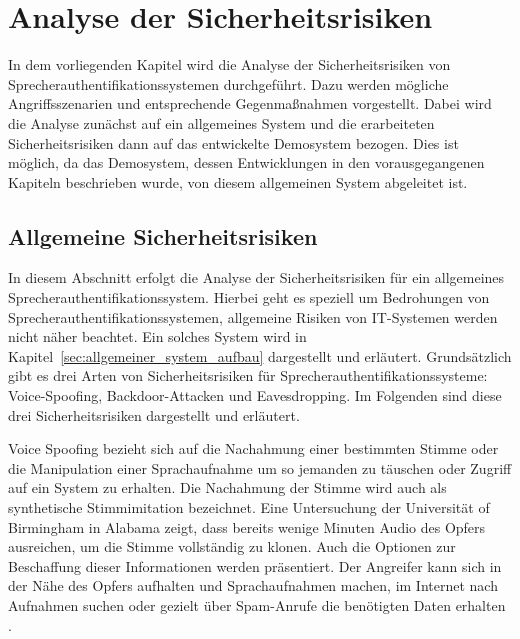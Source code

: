 \section{Analyse der Sicherheitsrisiken}\label{sec:Sicherheitsrisiken}
In dem vorliegenden Kapitel wird die Analyse der Sicherheitsrisiken von Sprecherauthentifikationssystemen durchgeführt.
Dazu werden mögliche Angriffsszenarien und entsprechende Gegenmaßnahmen vorgestellt.
Dabei wird die Analyse zunächst auf ein allgemeines System und die erarbeiteten Sicherheitsrisiken dann auf das entwickelte Demosystem bezogen.
Dies ist möglich, da das Demosystem, dessen Entwicklungen in den vorausgegangenen Kapiteln beschrieben wurde, von diesem allgemeinen System abgeleitet ist.

\subsection{Allgemeine Sicherheitsrisiken}
In diesem Abschnitt erfolgt die Analyse der Sicherheitsrisiken für ein allgemeines Sprecherauthentifikationssystem.
Hierbei geht es speziell um Bedrohungen von Sprecherauthentifikationssystemen, allgemeine Risiken von IT-Systemen werden nicht näher beachtet.
Ein solches System wird in Kapitel~\ref{sec:allgemeiner_system_aufbau} dargestellt und erläutert.
Grundsätzlich gibt es drei Arten von Sicherheitsrisiken für Sprecherauthentifikationssysteme: Voice-Spoofing, Backdoor-Attacken und Eavesdropping.
Im Folgenden sind diese drei Sicherheitsrisiken dargestellt und erläutert.

Voice Spoofing bezieht sich auf die Nachahmung einer bestimmten Stimme oder die Manipulation einer Sprachaufnahme um so jemanden zu täuschen oder Zugriff auf ein System zu erhalten.
Die Nachahmung der Stimme wird auch als synthetische Stimmimitation bezeichnet.
Eine Untersuchung der Universität of Birmingham in Alabama zeigt, dass bereits wenige Minuten Audio des Opfers ausreichen, um die Stimme vollständig zu klonen.
Auch die Optionen zur Beschaffung dieser Informationen werden präsentiert.
Der Angreifer kann sich in der Nähe des Opfers aufhalten und Sprachaufnahmen machen, im Internet nach Aufnahmen suchen oder gezielt über Spam-Anrufe die benötigten Daten erhalten \autocite[vgl.][]{katherine_shonesy_uab_2015}.

